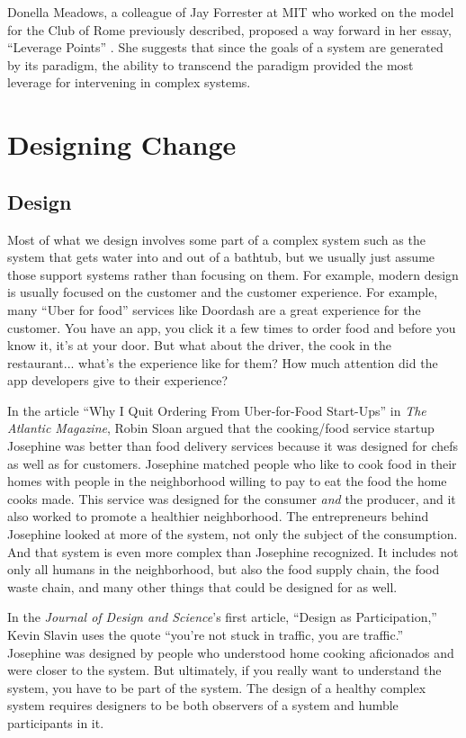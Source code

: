 Donella Meadows, a colleague of Jay Forrester at MIT who worked on the model for the Club of Rome previously described, proposed a way forward in her essay, ``Leverage Points'' \cite{meadows_leverage}. She suggests that since the goals of a system are generated by its paradigm, the ability to transcend the paradigm provided the most leverage for intervening in complex systems.

\section{Designing Change}
\subsection{Design}
\label{intro:design}

Most of what we design involves some part of a complex system such as the system that gets water into and out of a bathtub, but we usually just assume those support systems rather than focusing on them. For example, modern design is usually focused on the customer and the customer experience. For example, many ``Uber for food'' services like Doordash are a great experience for the customer. You have an app, you click it a few times to order food and before you know it, it's at your door. But what about the driver, the cook in the restaurant... what's the experience like for them? How much attention did the app developers give to their experience?

In the article ``Why I Quit Ordering From Uber-for-Food Start-Ups'' \cite{sloan2015quit} in \textit{The Atlantic Magazine}, Robin Sloan argued that the cooking/food service startup Josephine was better than food delivery services because it was designed for chefs as well as for customers. Josephine matched people who like to cook food in their homes with people in the neighborhood willing to pay to eat the food the home cooks made. This service was designed for the consumer \textit{and} the producer, and it also worked to promote a healthier neighborhood. The entrepreneurs behind Josephine looked at more of the system, not only the subject of the consumption. And that system is even more complex than Josephine recognized. It includes not only all humans in the neighborhood, but also the food supply chain, the food waste chain, and many other things that could be designed for as well.

In the \textit{Journal of Design and Science}'s first article, ``Design as Participation,'' \cite{slavin_design_2016} Kevin Slavin uses the quote ``you're not stuck in traffic, you are traffic.'' Josephine was designed by people who understood home cooking aficionados and were closer to the system. But ultimately, if you really want to understand the system, you have to be part of the system. The design of a healthy complex system requires designers to be both observers of a system and humble participants in it.


